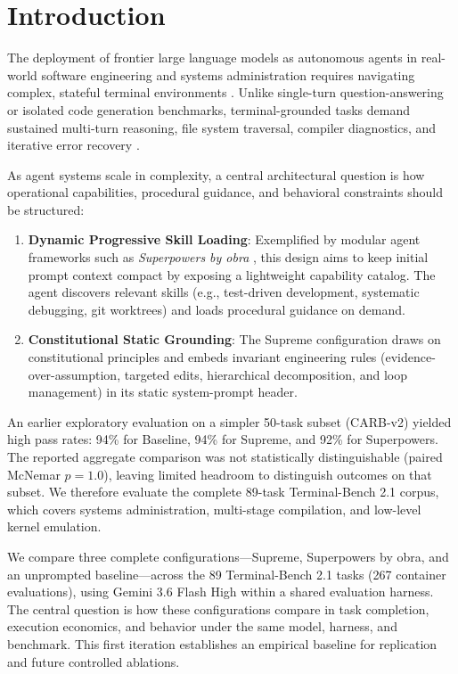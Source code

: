 \section{Introduction}
\label{sec:intro}

The deployment of frontier large language models as autonomous agents in real-world software engineering and systems administration requires navigating complex, stateful terminal environments \cite{shaw2025terminalbench, jimenez2024swebench}. Unlike single-turn question-answering or isolated code generation benchmarks, terminal-grounded tasks demand sustained multi-turn reasoning, file system traversal, compiler diagnostics, and iterative error recovery \cite{yao2023react, google2026gemini36}.

As agent systems scale in complexity, a central architectural question is how operational capabilities, procedural guidance, and behavioral constraints should be structured:
\begin{enumerate}\itemsep0pt \parskip0pt 
    \item \textbf{Dynamic Progressive Skill Loading}: Exemplified by modular agent frameworks such as \textit{Superpowers by obra} \cite{vincent2025superpowers}, this design aims to keep initial prompt context compact by exposing a lightweight capability catalog. The agent discovers relevant skills (e.g., test-driven development, systematic debugging, git worktrees) and loads procedural guidance on demand.
    \item \textbf{Constitutional Static Grounding}: The Supreme configuration draws on constitutional principles \cite{bai2022constitutional} and embeds invariant engineering rules (evidence-over-assumption, targeted edits, hierarchical decomposition, and loop management) in its static system-prompt header.
\end{enumerate}

An earlier exploratory evaluation on a simpler 50-task subset (CARB-v2) yielded high pass rates: 94\% for Baseline, 94\% for Supreme, and 92\% for Superpowers. The reported aggregate comparison was not statistically distinguishable (paired McNemar $p = 1.0$), leaving limited headroom to distinguish outcomes on that subset. We therefore evaluate the complete 89-task Terminal-Bench 2.1 corpus, which covers systems administration, multi-stage compilation, and low-level kernel emulation.

We compare three complete configurations---Supreme, Superpowers by obra, and an unprompted baseline---across the 89 Terminal-Bench 2.1 tasks (267 container evaluations), using Gemini 3.6 Flash High within a shared evaluation harness. The central question is how these configurations compare in task completion, execution economics, and behavior under the same model, harness, and benchmark. This first iteration establishes an empirical baseline for replication and future controlled ablations.

